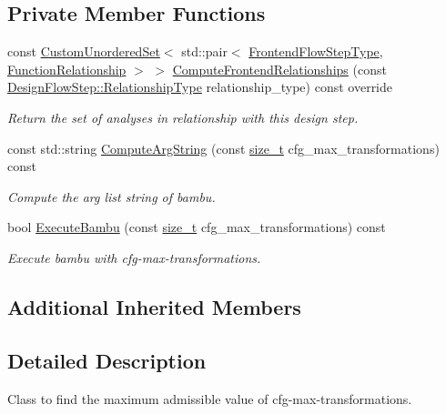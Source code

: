\subsection*{Private Member Functions}
\begin{DoxyCompactItemize}
\item 
const \hyperlink{classCustomUnorderedSet}{Custom\+Unordered\+Set}$<$ std\+::pair$<$ \hyperlink{frontend__flow__step_8hpp_afeb3716c693d2b2e4ed3e6d04c3b63bb}{Frontend\+Flow\+Step\+Type}, \hyperlink{classFrontendFlowStep_af7cf30f2023e5b99e637dc2058289ab0}{Function\+Relationship} $>$ $>$ \hyperlink{classFindMaxCFGTransformations_a3a6feda897d0aa27128f9ae8b884cea1}{Compute\+Frontend\+Relationships} (const \hyperlink{classDesignFlowStep_a723a3baf19ff2ceb77bc13e099d0b1b7}{Design\+Flow\+Step\+::\+Relationship\+Type} relationship\+\_\+type) const override
\begin{DoxyCompactList}\small\item\em Return the set of analyses in relationship with this design step. \end{DoxyCompactList}\item 
const std\+::string \hyperlink{classFindMaxCFGTransformations_a926abf2592f4fc8ca8b030476b0cdbae}{Compute\+Arg\+String} (const \hyperlink{tutorial__fpt__2017_2intro_2sixth_2test_8c_a7c94ea6f8948649f8d181ae55911eeaf}{size\+\_\+t} cfg\+\_\+max\+\_\+transformations) const
\begin{DoxyCompactList}\small\item\em Compute the arg list string of bambu. \end{DoxyCompactList}\item 
bool \hyperlink{classFindMaxCFGTransformations_a57355680b93a3644f7c51a7a66bea078}{Execute\+Bambu} (const \hyperlink{tutorial__fpt__2017_2intro_2sixth_2test_8c_a7c94ea6f8948649f8d181ae55911eeaf}{size\+\_\+t} cfg\+\_\+max\+\_\+transformations) const
\begin{DoxyCompactList}\small\item\em Execute bambu with cfg-\/max-\/transformations. \end{DoxyCompactList}\end{DoxyCompactItemize}
\subsection*{Additional Inherited Members}


\subsection{Detailed Description}
Class to find the maximum admissible value of cfg-\/max-\/transformations. 

